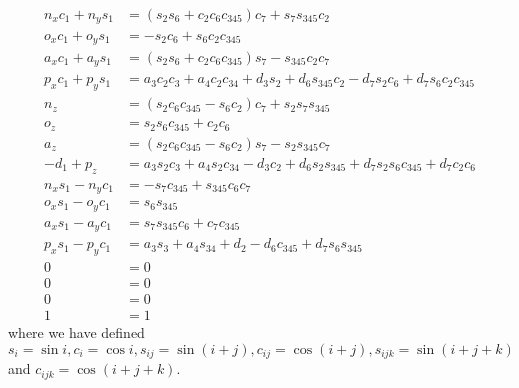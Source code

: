 \documentclass[onecolumn,10pt]{jhwhw}
\begin{document}
\begin{align}
n_{x} c_1 + n_{y} s_1 &= \left(s_{2} s_{6} + c_{2} c_{6} c_{345}\right) c_{7} + s_{7} s_{345} c_{2} \label{eq1} \\
o_{x} c_1 + o_{y} s_1 &= - s_{2} c_{6} + s_{6} c_{2} c_{345} \label{eq5} \\
a_{x} c_1 + a_{y} s_1 &= \left(s_{2} s_{6} + c_{2} c_{6} c_{345}\right) s_{7} - s_{345} c_{2} c_{7} \label{eq7} \\
p_{x} c_1 + p_{y} s_1 &= a_{3} c_{2} c_{3} + a_{4} c_{2} c_{34} + d_{3} s_{2} + d_{6} s_{345} c_{2} - d_{7} s_{2} c_{6} + d_{7} s_{6} c_{2} c_{345} \label{eq3} \\
n_{z}                 &= \left(s_{2} c_{6} c_{345} - s_{6} c_{2}\right) c_{7} + s_{2} s_{7} s_{345} \label{eq2} \\
o_{z}                 &= s_{2} s_{6} c_{345} + c_{2} c_{6} \label{eq6} \\
a_{z}                 &= \left(s_{2} c_{6} c_{345} - s_{6} c_{2}\right) s_{7} - s_{2} s_{345} c_{7} \label{eq8} \\
- d_{1} + p_{z}       &= a_{3} s_{2} c_{3} + a_{4} s_{2} c_{34} - d_{3} c_{2} + d_{6} s_{2} s_{345} + d_{7} s_{2} s_{6} c_{345} + d_{7} c_{2} c_{6} \label{eq4} \\
n_{x} s_1 - n_{y} c_1 &= - s_{7} c_{345} + s_{345} c_{6} c_{7} \label{th51}\\
o_{x} s_1 - o_{y} c_1 &= s_{6} s_{345} \label{th53} \\
a_{x} s_1 - a_{y} c_1 &= s_{7} s_{345} c_{6} + c_{7} c_{345} \label{th52} \\
p_{x} s_1 - p_{y} c_1 &= a_{3} s_{3} + a_{4} s_{34} + d_{2} - d_{6} c_{345} + d_{7} s_{6} s_{345} \\
0                     &= 0 \\
0                     &= 0 \\
0                     &= 0 \\
1                     &= 1
\end{align}
where we have defined $s_i = \sin{i}, c_i = \cos{i}, s_{ij} = \sin{\left(i+j\right)}, c_{ij} = \cos{\left(i+j\right)}, s_{ijk} = \sin{\left(i+j+k\right)}$ and $c_{ijk} = \cos{\left(i+j+k\right)}$.
\end{document}
